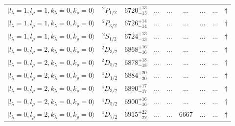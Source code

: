 \begin{tabular}{c c| c c c c c c c}
$\vert l_{\lambda}\!\!=\!1, l_{\rho}\!\!=\!1, k_{\lambda}\!\!=\!0, k_{\rho}\!\!=\!0 \rangle$ & $^{2}P_{1/2}$ & $6720^{+13}_{-13}$ & ... & ... & ... & ... & ... & $\dagger$ \\ 
$\vert l_{\lambda}\!\!=\!1, l_{\rho}\!\!=\!1, k_{\lambda}\!\!=\!0, k_{\rho}\!\!=\!0 \rangle$ & $^{2}P_{3/2}$ & $6726^{+14}_{-14}$ & ... & ... & ... & ... & ... & $\dagger$ \\ 
$\vert l_{\lambda}\!\!=\!1, l_{\rho}\!\!=\!1, k_{\lambda}\!\!=\!0, k_{\rho}\!\!=\!0 \rangle$ & $^{2}S_{1/2}$ & $6724^{+13}_{-13}$ & ... & ... & ... & ... & ... & $\dagger$ \\ 
$\vert l_{\lambda}\!\!=\!0, l_{\rho}\!\!=\!2, k_{\lambda}\!\!=\!0, k_{\rho}\!\!=\!0 \rangle$ & $^{2}D_{3/2}$ & $6868^{+16}_{-16}$ & ... & ... & ... & ... & ... & $\dagger$ \\ 
$\vert l_{\lambda}\!\!=\!0, l_{\rho}\!\!=\!2, k_{\lambda}\!\!=\!0, k_{\rho}\!\!=\!0 \rangle$ & $^{2}D_{5/2}$ & $6878^{+18}_{-18}$ & ... & ... & ... & ... & ... & $\dagger$ \\ 
$\vert l_{\lambda}\!\!=\!0, l_{\rho}\!\!=\!2, k_{\lambda}\!\!=\!0, k_{\rho}\!\!=\!0 \rangle$ & $^{4}D_{1/2}$ & $6884^{+20}_{-20}$ & ... & ... & ... & ... & ... & $\dagger$ \\ 
$\vert l_{\lambda}\!\!=\!0, l_{\rho}\!\!=\!2, k_{\lambda}\!\!=\!0, k_{\rho}\!\!=\!0 \rangle$ & $^{4}D_{3/2}$ & $6890^{+17}_{-17}$ & ... & ... & ... & ... & ... & $\dagger$ \\ 
$\vert l_{\lambda}\!\!=\!0, l_{\rho}\!\!=\!2, k_{\lambda}\!\!=\!0, k_{\rho}\!\!=\!0 \rangle$ & $^{4}D_{5/2}$ & $6900^{+16}_{-16}$ & ... & ... & ... & ... & ... & $\dagger$ \\ 
$\vert l_{\lambda}\!\!=\!0, l_{\rho}\!\!=\!2, k_{\lambda}\!\!=\!0, k_{\rho}\!\!=\!0 \rangle$ & $^{4}D_{7/2}$ & $6915^{+22}_{-22}$ & ... & ... & $6667$ & ... & ... & $\dagger$ \\ 
\hline \hline
\end{tabular}

